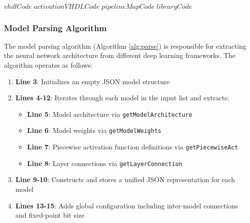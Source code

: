 \begin{algorithm}[htbp]
    \caption{Generate \gls{vhdl} Code Components}\label{alg:generate-vhdl}
    \begin{algorithmic}[1]
        \State \Return $vhdlCode$
    \EndFunction
        \State \Return $activationVHDLCode$
    \EndFunction
        \State \Return $pipelineMapCode$
    \EndFunction
        \State \Return $libraryCode$
    \EndFunction
    \end{algorithmic}
\end{algorithm}


\subsubsection{Model Parsing Algorithm}
The model parsing algorithm (Algorithm \ref{alg:parse}) is responsible for extracting the neural network architecture from different deep learning frameworks. The algorithm operates as follows:

\begin{enumerate}
    \item \textbf{Line 3}: Initializes an empty JSON model structure
    \item \textbf{Lines 4-12}: Iterates through each model in the input list and extracts:
        \begin{itemize}
            \item \textbf{Line 5}: Model architecture via \texttt{getModelArchitecture}
            \item \textbf{Line 6}: Model weights via \texttt{getModelWeights}
            \item \textbf{Line 7}: Piecewise activation function definitions via \texttt{getPiecewiseAct}
            \item \textbf{Line 8}: Layer connections via \texttt{getLayerConnection}
        \end{itemize}
    \item \textbf{Line 9-10}: Constructs and stores a unified JSON representation for each model
    \item \textbf{Lines 13-15}: Adds global configuration including inter-model connections and fixed-point bit size
\end{enumerate}

